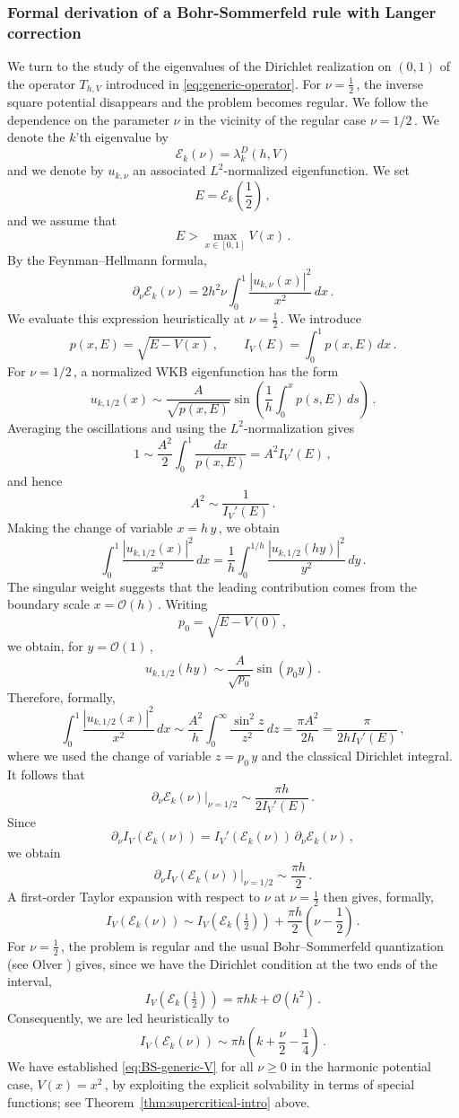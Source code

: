 \documentclass[11pt]{amsart}
\numberwithin{equation}{section}
\theoremstyle{remark}
\newcommand{\cE}{\mathcal E}
\begin{document}
\subsubsection{Formal derivation of a Bohr-Sommerfeld rule with Langer correction}
%
%
We turn to the study of the eigenvalues of the Dirichlet realization on $(0,1)$ of the operator $T_{h,V}$ introduced in \eqref{eq:generic-operator}. For $\nu=\frac12\,$, the inverse square potential disappears and the problem becomes regular. We  follow the dependence on the parameter $\nu$ in the vicinity of the regular case $\nu=1/2\,$. We denote the $k$'th eigenvalue by
\[\cE_k(\nu)=\lambda_k^D(h,V)\]
and we denote by $u_{k,\nu}$ an associated
$L^2$-normalized eigenfunction. We set
\[
E=\cE_k\left(\frac12\right)\,,
\]
and we assume that
\[
E>\max_{x\in[0,1]}V(x)\,.
\]
%
By the Feynman--Hellmann formula,
\[
\partial_\nu \cE_k(\nu)
=
2h^2\nu\int_0^1\frac{|u_{k,\nu}(x)|^2}{x^2}\,dx\,.
\]
We evaluate this expression heuristically at $\nu=\frac12$\,.
We introduce
\[
p(x,E)=\sqrt{E-V(x)}\,,
\qquad
I_V(E)=\int_0^1p(x,E)\,dx\,.
\]
For $\nu=1/2\,$, a normalized WKB eigenfunction has the form
\[
u_{k,1/2}(x)\sim
\frac{A}{\sqrt{p(x,E)}}
\sin\left(\frac1h\int_0^x p(s,E)\,ds\right)\,.
\]
Averaging the oscillations and using the $L^2$-normalization gives
\[
1\sim
\frac{A^2}{2}\int_0^1\frac{dx}{p(x,E)}
=
A^2I_V'(E)\,,
\]
and hence
\[
A^2\sim\frac{1}{I_V'(E)}\,.
\]
Making the change of variable $x=h\,y\,$, we obtain
\[
\int_0^1\frac{|u_{k,1/2}(x)|^2}{x^2}\,dx
=
\frac{1}{h}\int_0^{1/h}\frac{|u_{k,1/2}(hy)|^2}{y^2}\,dy\,.
\]
The singular weight suggests that the leading contribution comes from
the boundary scale $x=\mathcal O(h)\,$. Writing
\[
p_0=\sqrt{E-V(0)}\,,
\]
we obtain, for $y=\mathcal O(1)$\,,
\[
u_{k,1/2}(hy)\sim
\frac{A}{\sqrt{p_0}}\sin(p_0y)\,.
\]
Therefore, formally,
\[
\int_0^1\frac{|u_{k,1/2}(x)|^2}{x^2}\,dx
\sim
\frac{A^2}{h}
\int_0^\infty\frac{\sin^2 z}{z^2}\,dz
=
\frac{\pi A^2}{2h}
=
\frac{\pi}{2hI_V'(E)}\,,
\]
where we used the change of variable $z=p_0\, y$ and the classical
Dirichlet integral. It follows that
\[
\left.\partial_\nu \cE_k(\nu)\right|_{\nu=1/2}
\sim
\frac{\pi h}{2I_V'(E)}\,.
\]
Since
\[
\partial_\nu I_V(\cE_k(\nu))
=
I_V'(\cE_k(\nu))\,\partial_\nu \cE_k(\nu)\,,
\]
we obtain
\[
\left.
\partial_\nu I_V(\cE_k(\nu))
\right|_{\nu=1/2}
\sim
\frac{\pi h}{2}\,.
\]
A first-order Taylor expansion with respect to $\nu$ at $\nu=\frac12$
then gives, formally,
\[
I_V(\cE_k(\nu))
\sim
I_V(
\cE_k(\tfrac12))
+
\frac{\pi h}{2}\left(\nu-\frac12\right)\,.
\]
For $\nu=\frac12\,$, the problem is regular and the usual
Bohr--Sommerfeld quantization (see Olver \cite{Olver}) gives, since we have the Dirichlet condition at the two ends of the interval, 
\[
I_V(\cE_k(\tfrac12))=\pi hk+\mathcal O(h^2)\,.
\]
Consequently, we are led heuristically to
\begin{equation}\label{eq:BS-generic-V}
I_V(\cE_k(\nu))
\sim
\pi h\left(k+\frac{\nu}{2}-\frac14\right)\,.
\end{equation}
We have established \eqref{eq:BS-generic-V} for all $\nu\geq 0$ in the harmonic potential case, $V(x)=x^2\,$,  by exploiting the explicit solvability in terms of special functions; see Theorem~\ref{thm:supercritical-intro} above.
\end{document}

